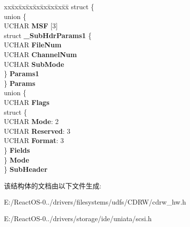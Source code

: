 \begin{DoxyCompactItemize}
\begin{tabbing}
\end{tabbing}\item 
\mbox{\label{struct___m_o_d_e___w_r_i_t_e___p_a_r_a_m_s___p_a_g_e_a4d60838624341ea92aa36b25d1268a28}} 
\begin{tabbing}
xx\=xx\=xx\=xx\=xx\=xx\=xx\=xx\=xx\=\kill
struct \{\\
\>union \{\\
\>\>UCHAR {\bfseries MSF} \mbox{[}3\mbox{]}\\
\>\>struct {\bfseries \_SubHdrParams1} \{\\
\>\>\>UCHAR {\bfseries FileNum}\\
\>\>\>UCHAR {\bfseries ChannelNum}\\
\>\>\>UCHAR {\bfseries SubMode}\\
\>\>\} {\bfseries Params1}\\
\>\} {\bfseries Params}\\
\>union \{\\
\>\>UCHAR {\bfseries Flags}\\
\>\>struct \{\\
\>\>\>UCHAR {\bfseries Mode}: 2\\
\>\>\>UCHAR {\bfseries Reserved}: 3\\
\>\>\>UCHAR {\bfseries Format}: 3\\
\>\>\} {\bfseries Fields}\\
\>\} {\bfseries Mode}\\
\} {\bfseries SubHeader}\\

\end{tabbing}\end{DoxyCompactItemize}


该结构体的文档由以下文件生成\+:\begin{DoxyCompactItemize}
\item 
E\+:/\+React\+O\+S-\/0../drivers/filesystems/udfs/\+C\+D\+R\+W/cdrw\+\_\+hw.\+h\item 
E\+:/\+React\+O\+S-\/0../drivers/storage/ide/uniata/scsi.\+h\end{DoxyCompactItemize}
